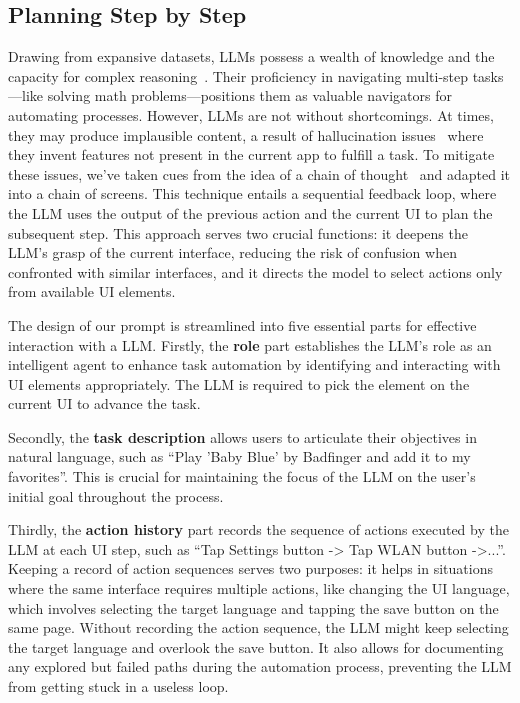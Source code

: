 \subsection{Planning Step by Step}
\label{sec:prompt}

Drawing from expansive datasets, LLMs possess a wealth of knowledge and the capacity for complex reasoning~\cite{brown2020language,chowdhery2023palm,wei2022chain}. Their proficiency in navigating multi-step tasks—like solving math problems—positions them as valuable navigators for automating processes. However, LLMs are not without shortcomings. At times, they may produce implausible content, a result of hallucination issues~\cite{maynez-etal-2020-faithfulness} where they invent features not present in the current app to fulfill a task. To mitigate these issues, we've taken cues from the idea of a chain of thought~\cite{wei2022chain} and adapted it into a chain of screens. This technique entails a sequential feedback loop, where the LLM uses the output of the previous action and the current UI to plan the subsequent step. This approach serves two crucial functions: it deepens the LLM’s grasp of the current interface, reducing the risk of confusion when confronted with similar interfaces, and it directs the model to select actions only from available UI elements.

The design of our prompt is streamlined into five essential parts for effective interaction with a LLM. Firstly, the \textbf{role} part establishes the LLM's role as an intelligent agent to enhance task automation by identifying and interacting with UI elements appropriately. The LLM is required to pick the element on the current UI to advance the task. 

Secondly, the \textbf{task description} allows users to articulate their objectives in natural language, such as ``Play 'Baby Blue' by Badfinger and add it to my favorites''. This is crucial for maintaining the focus of the LLM on the user's initial goal throughout the process.

Thirdly, the \textbf{action history} part records the sequence of actions executed by the LLM at each UI step, such as ``Tap Settings button -> Tap WLAN button ->...''. Keeping a record of action sequences serves two purposes: it helps in situations where the same interface requires multiple actions, like changing the UI language, which involves selecting the target language and tapping the save button on the same page. Without recording the action sequence, the LLM might keep selecting the target language and overlook the save button. It also allows for documenting any explored but failed paths during the automation process, preventing the LLM from getting stuck in a useless loop. 

